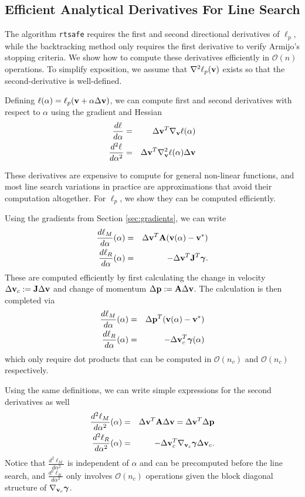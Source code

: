 \subsection{Efficient Analytical Derivatives For Line Search}

The algorithm \verb;rtsafe; requires the first and second directional
derivatives of $\ell_p$, while the
backtracking method only requires the first derivative to verify Armijo's
stopping criteria. We show how to compute these derivatives efficiently in
$\mathcal{O}(n)$ operations. To simplify exposition, we assume
that $\nabla^2 \ell_p({\mathbf{v}})$ exists so that the second-derivative is well-defined.

Defining $\ell(\alpha) = \ell_p({\mathbf{v}}+\alpha\Delta{\mathbf{v}})$, we can compute first
and second derivatives with respect to $\alpha$ using the gradient and Hessian
\begin{eqnarray}
	\frac{d\ell}{d\alpha}&=&\Delta{\mathbf{v}}^T\nabla_{\mathbf{v}}\ell(\alpha)\nonumber\\
	\frac{d^2\ell}{d\alpha^2}&=&\Delta{\mathbf{v}}^T\nabla_{\mathbf{v}}^2\ell(\alpha)\Delta{\mathbf{v}}\nonumber
\end{eqnarray}

These derivatives are expensive to compute for general non-linear functions, and
most line search variations in practice are approximations that avoid their
computation altogether. For $\ell_p$, we  show they can be
computed efficiently.

Using the gradients from Section \ref{sec:gradients}, we can write
\begin{eqnarray}
	\frac{d\ell_M}{d\alpha}(\alpha)&=&\Delta{\mathbf{v}}^T{\mathbf{A}}({\mathbf{v}}(\alpha)-{\mathbf{v}}^*)\\
	\frac{d\ell_R}{d\alpha}(\alpha)&=&-\Delta{\mathbf{v}}^T{\mathbf{J}}^T{\bm\gamma}.
\end{eqnarray}
These are computed efficiently by first calculating the change in velocity
$\Delta{\mathbf{v}}_c:={\mathbf{J}}\Delta{\mathbf{v}}$ and change of momentum $\Delta{\mathbf{p}} :=
{\mathbf{A}}\Delta{\mathbf{v}}$. The calculation is then completed via 
\begin{eqnarray}
	\frac{d\ell_M}{d\alpha}(\alpha)&=&\Delta{\mathbf{p}}^T({\mathbf{v}}(\alpha)-{\mathbf{v}}^*)\\
	\frac{d\ell_R}{d\alpha}(\alpha)&=&-\Delta{\mathbf{v}}_c^T{\bm\gamma}(\alpha)
\end{eqnarray}
which only require dot products that can be computed in $\mathcal{O}(n_v)$ and
$\mathcal{O}(n_c)$ respectively.

Using the same definitions, we can write simple expressions for the second
derivatives as well
\begin{eqnarray}
	\frac{d^2\ell_M}{d\alpha^2}(\alpha)&=&\Delta{\mathbf{v}}^T{\mathbf{A}}\Delta{\mathbf{v}}=\Delta{\mathbf{v}}^T\Delta{\mathbf{p}}\\
	\frac{d^2\ell_R}{d\alpha^2}(\alpha)&=&-\Delta{\mathbf{v}}_c^T
	\nabla_{{\mathbf{v}}_c}{\bm\gamma}\Delta{\mathbf{v}}_c.
\end{eqnarray}
Notice that $\frac{d^2\ell_M}{d\alpha^2}$ is independent of $\alpha$ and
can be precomputed before the line search, and
$\frac{d^2\ell_R}{d\alpha^2}$ only involves $\mathcal{O}(n_c)$ operations given
the block diagonal structure of $\nabla_{{\mathbf{v}}_c}{\bm\gamma}$.

